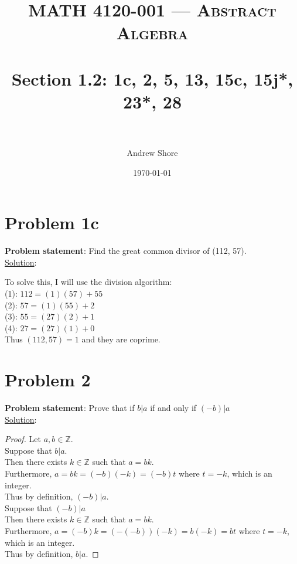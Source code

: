 \documentclass{article} %
\title{ 
\normalfont \normalsize 
\textsc{MATH 4120-001 --- Abstract Algebra} \\
\horrule{0.5pt} \\[0cm] %
\huge Section 1.2: 1c, 2, 5, 13, 15c, 15j*, 23*, 28  \\ %
\horrule{2pt} \\[0cm] %
}
\author{Andrew Shore} %
\date{\normalsize\today} %
\begin{document}
\maketitle %


\section*{Problem 1c}


\textbf{Problem statement}: Find the great common divisor of (112, 57).
\\

\underline{Solution}: 
\begin{addmargin}[1em]{0em}
To solve this, I will use the division algorithm:
\\(1): $112 = (1)(57) + 55$
\\(2): $57 = (1)(55) + 2$
\\(3): $55 = (27)(2) + 1$
\\(4): $27 = (27)(1) + 0$
\\Thus $(112, 57) = 1$ and they are coprime.
\end{addmargin}    

\newpage

\section*{Problem 2}

\textbf{Problem statement}: Prove that if $b|a$ if and only if $(-b)|a$
\\

\underline{Solution}: 
\begin{addmargin}[1em]{0em}
\begin{proof}
Let $a,b \in \mathbb{Z}$.
\\ \marginpar{$\Rightarrow$}
Suppose that $b|a$.
\\Then there exists $k \in \mathbb{Z}$ such that $a = bk$.
\\Furthermore, $a = bk = (-b)(-k) = (-b)t$ where $t = -k$, which is an integer.
\\Thus by definition, $(-b)|a$.
\\ \marginpar{$\Leftarrow$}
Suppose that $(-b)|a$
\\Then there exists $k \in \mathbb{Z}$ such that $a = bk$.
\\Furthermore, $a = (-b)k = (-(-b))(-k) = b(-k) = bt$ where $t = -k$, which is an integer.
\\Thus by definition, $b|a$.
\end{proof}
\end{addmargin}
\end{document}
